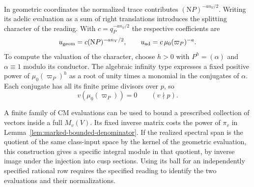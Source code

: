 In geometric coordinates the normalized trace contributes
\((\mathrm NP)^{-a n_V/2}\). Writing its adelic evaluation as
a sum of right translations introduces the splitting character
of the reading. With \(c=q_P^{-a n_V/2}\) the respective
coefficients are
\[
 u_{\rm geom}=c(\mathrm NP)^{-a n_V/2},\qquad
 u_{\rm ad}=c\,\mu_0(\varpi_P)^{-a}.
\]
To compute the valuation of the character, choose \(h>0\) with
\(P^h=(\alpha)\) and \(\alpha\equiv1\) modulo its conductor.
The algebraic infinity type expresses a fixed positive power of
\(\mu_0(\varpi_P)^h\) as a root of unity times a monomial in the
conjugates of \(\alpha\). Each conjugate has all its finite prime
divisors over \(p\), so
\[
                    v(\mu_0(\varpi_P))=0\qquad(v\nmid p).
\]

A finite family of CM evaluations can be used to bound a prescribed
collection of vectors inside a full \(M_v(V)\). Its fixed inverse
matrix costs the power of \(\pi_v\) in
Lemma~\ref{lem:marked-bounded-denominator}. If the realized
spectral span is the quotient of the same class-input space by the
kernel of the geometric evaluation, this construction gives a
specific integral module in that quotient, by inverse image under
the injection into cusp sections. Using its ball for an independently
specified rational row requires the specified reading to identify
the two evaluations and their normalizations.

